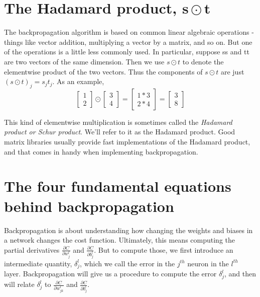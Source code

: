 \documentclass[a4paper,12pt]{report}%
\begin{document}
\section{The Hadamard product, $\mathbf{s} \odot \mathbf{t}$}
The backpropagation algorithm is based on common linear algebraic operations - things like vector addition, multiplying a vector by a matrix, and so on. But one of the operations is a little less commonly used. In particular, suppose ss and tt are two vectors of the same dimension. Then we use $s\odot t$ to denote the elementwise product of the two vectors. Thus the components of $s \odot t$ are just $(s \odot t)_{j}= s_{j}t_{j}$. As an example,
\begin{equation}
 \begin{bmatrix} 1 \\ 2 \end{bmatrix} \odot \begin{bmatrix} 3 \\ 4 \end{bmatrix} = \begin{bmatrix} 1 * 3 \\ 2 * 4 \end{bmatrix} = \begin{bmatrix} 3 \\ 8 \end{bmatrix}
\end{equation}

This kind of elementwise multiplication is sometimes called the {\it Hadamard product or Schur product}. We'll refer to it as the Hadamard product. Good matrix libraries usually provide fast implementations of the Hadamard product, and that comes in handy when implementing backpropagation.

\section{The four fundamental equations behind backpropagation}
Backpropagation is about understanding how changing the weights and biases in a network changes the cost function. Ultimately, this means computing the partial derivatives $\frac{∂C}{∂w_{j}^{l}}$ and $\frac{∂C}{∂b_{j}^{l}}$. But to compute those, we first introduce an intermediate quantity, $\delta_{j}^{l}$, which we call the error in the $j^{th}$ neuron in the $l^{th}$ layer. Backpropagation will give us a procedure to compute the error $\delta_{j}^{l}$, and then will relate $\delta_{j}^{l}$ to $\frac{\partial C}{\partial w_{jk}^{l}}$ and $\frac{∂C}{∂b_{j}^{l}}$.
\end{document}
